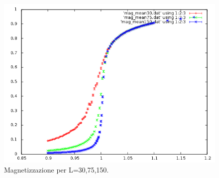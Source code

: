 \begin{figure}[h]
\centering
\includegraphics[scale=0.5]{potts/mag_taglia.png}
\caption{Magnetizzazione per L=30,75,150.}
\end{figure}
\newpage
